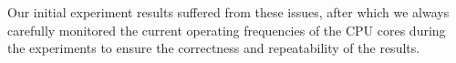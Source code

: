Our initial experiment results suffered from these issues, after which
we always carefully monitored the current operating frequencies of the
CPU cores during the experiments to ensure the correctness and
repeatability of the results.


